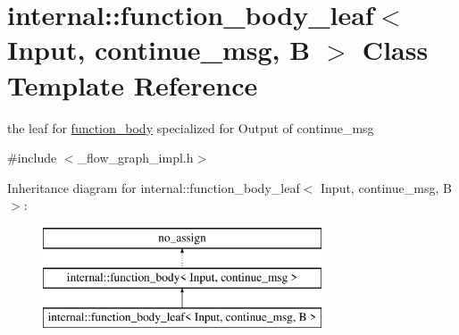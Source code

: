 \hypertarget{classinternal_1_1function__body__leaf_3_01Input_00_01continue__msg_00_01B_01_4}{}\section{internal\+:\+:function\+\_\+body\+\_\+leaf$<$ Input, continue\+\_\+msg, B $>$ Class Template Reference}
\label{classinternal_1_1function__body__leaf_3_01Input_00_01continue__msg_00_01B_01_4}


the leaf for \hyperlink{classinternal_1_1function__body}{function\+\_\+body} specialized for Output of continue\+\_\+msg  




{\ttfamily \#include $<$\+\_\+flow\+\_\+graph\+\_\+impl.\+h$>$}

Inheritance diagram for internal\+:\+:function\+\_\+body\+\_\+leaf$<$ Input, continue\+\_\+msg, B $>$\+:\begin{figure}[H]
\begin{center}
\leavevmode
\includegraphics[height=3.000000cm]{classinternal_1_1function__body__leaf_3_01Input_00_01continue__msg_00_01B_01_4}
\end{center}
\end{figure}
